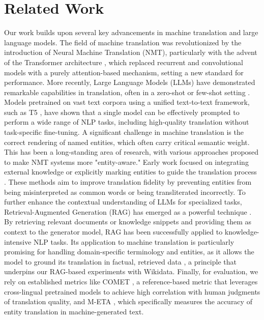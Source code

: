\documentclass{ecai}
\begin{document}
\section{Related Work}
\label{sec:related}
Our work builds upon several key advancements in machine translation and large language models. 
The field of machine translation was revolutionized by the introduction of Neural Machine Translation (NMT), 
particularly with the advent of the Transformer architecture \cite{vaswani2017attention}, 
which replaced recurrent and convolutional models with a purely attention-based mechanism, 
setting a new standard for performance.
More recently, Large Language Models (LLMs) have demonstrated remarkable capabilities in translation, 
often in a zero-shot or few-shot setting \cite{brown2020language}. 
Models pretrained on vast text corpora using a unified text-to-text framework, 
such as T5 \cite{raffel2020exploring}, have shown that a single model can be effectively prompted 
to perform a wide range of NLP tasks, including high-quality translation without task-specific fine-tuning.
A significant challenge in machine translation is the correct rendering of named entities,
which often carry critical semantic weight. This has been a long-standing area of research, 
with various approaches proposed to make NMT systems more "entity-aware." 
Early work focused on integrating external knowledge or explicitly marking entities to guide the translation process 
\cite{gazzola2019named, ennis2021improving}. 
These methods aim to improve translation fidelity by preventing entities from being misinterpreted 
as common words or being transliterated incorrectly.
To further enhance the contextual understanding of LLMs for specialized tasks, 
Retrieval-Augmented Generation (RAG) has emerged as a powerful technique \cite{lewis2020retrieval}. 
By retrieving relevant documents or knowledge snippets and providing them as context to the generator model, 
RAG has been successfully applied to knowledge-intensive NLP tasks. Its application to machine translation is 
particularly promising for handling domain-specific terminology and entities, 
as it allows the model to ground its translation in factual, retrieved data \cite{cai2021retrieval}, 
a principle that underpins our RAG-based experiments with Wikidata. 
Finally, for evaluation, we rely on established metrics like COMET \cite{rei-etal-2020-comet}, 
a reference-based metric that leverages cross-lingual pretrained models to achieve high correlation
with human judgments of translation quality, and M-ETA \cite{conia-etal-2024-m-eta},
which specifically measures the accuracy of entity translation in machine-generated text.
\end{document}
